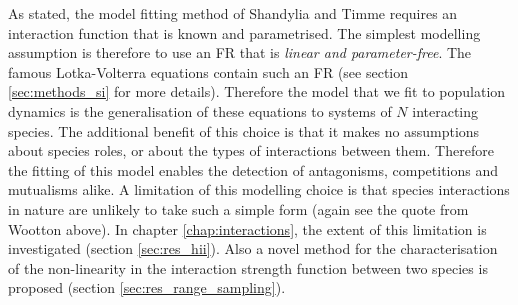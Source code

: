 As stated, the model fitting method of Shandylia and Timme \cite{shandilya2011inferring} requires an interaction function that is known and parametrised. The simplest modelling assumption is therefore to use an FR that is \emph{linear and parameter-free}. The famous Lotka-Volterra equations \cite{lotka1925elements,volterra1926} contain such an FR (see section \ref{sec:methods_si} for more details). Therefore the model that we fit to population dynamics is the generalisation of these equations to systems of $N$ interacting species. The additional benefit of this choice is that it makes no assumptions about species roles, or about the types of interactions between them. Therefore the fitting of this model enables the detection of antagonisms, competitions and mutualisms alike. A limitation of this modelling choice is that species interactions in nature are unlikely to take such a simple form (again see the quote from Wootton above). In chapter \ref{chap:interactions}, the extent of this limitation is investigated (section \ref{sec:res_hii}). Also a novel method for the characterisation of the non-linearity in the interaction strength function between two species is proposed (section \ref{sec:res_range_sampling}).







%
%


